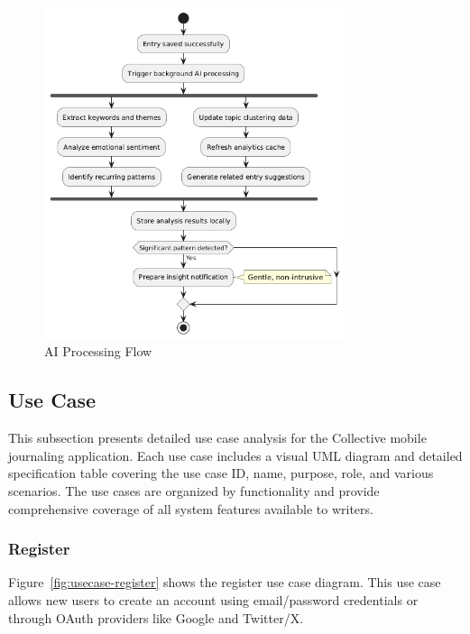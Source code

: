\begin{figure}[H]
\centering
\includegraphics[width=0.8\textwidth]{files/imgs/ai_processing_flow.png}
\caption{AI Processing Flow}
\label{fig:ai-processing-flow}
\end{figure}
\clearpage

\subsection{Use Case}\label{subsec:useCase}

This subsection presents detailed use case analysis for the Collective mobile journaling application. Each use case includes a visual UML diagram and detailed specification table covering the use case ID, name, purpose, role, and various scenarios. The use cases are organized by functionality and provide comprehensive coverage of all system features available to writers.

\subsubsection{Register}

Figure~\ref{fig:usecase-register} shows the register use case diagram. This use case allows new users to create an account using email/password credentials or through OAuth providers like Google and Twitter/X.

